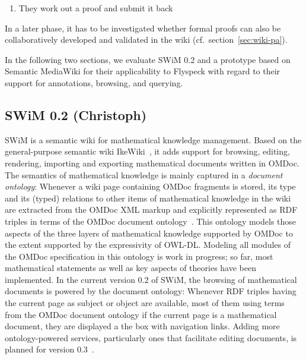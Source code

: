\documentclass{llncs}
\begin{document}
\begin{enumerate}
\item They work out a proof and submit it back
\end{enumerate}

In a later phase, it has to be investigated whether formal proofs can also be
collaboratively developed and validated in the wiki (cf.\ section~\ref{sec:wiki-pa}).

In the following two sections, we evaluate SWiM 0.2 and a prototype based on Semantic
MediaWiki for their applicability to Flyspeck with regard to their support for
annotations, browsing, and querying.

\subsection{SWiM 0.2 (Christoph)}
\label{sec:swim}

SWiM is a semantic wiki for mathematical knowledge management.  Based on the
general-purpose semantic wiki IkeWiki~\cite{KrSchVr:semwiki-reasoning07}, it adds support
for browsing, editing, rendering, importing and exporting mathematical documents written
in OMDoc.  The semantics of mathematical knowledge is mainly captured in a \emph{document
  ontology}: Whenever a wiki page containing OMDoc fragments is stored, its type and its
(typed) relations to other items of mathematical knowledge in the wiki are extracted from
the OMDoc XML markup and explicitly represented as RDF triples in terms of the OMDoc
document ontology~\cite{OMDocDocOnto:web}.  This ontology models those aspects of the
three layers of mathematical knowledge supported by OMDoc to the extent supported by the
expressivity of OWL-DL.  Modeling all modules of the OMDoc specification in this ontology
is work in progress; so far, most mathematical statements as well as key aspects of
theories have been implemented.  In the current version 0.2 of SWiM, the browsing of
mathematical documents is powered by the document ontology: Whenever RDF triples having
the current page as subject or object are available, most of them using terms from the
OMDoc document ontology if the current page is a mathematical document, they are displayed
a the box with navigation links.  Adding more ontology-powered services, particularly ones
that facilitate editing documents, is planned for version
0.3~\cite{swim-roadmap}.
\end{document}
